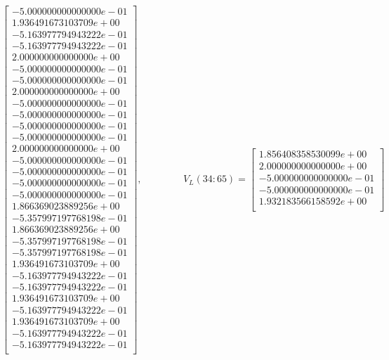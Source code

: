 \documentclass[12pt]{article}
\begin{document}
\begin{itemize}
\begin{small}
$$\begin{bmatrix}
    -5.000000000000000e-01\\
     1.936491673103709e+00\\
    -5.163977794943222e-01\\
    -5.163977794943222e-01\\
     2.000000000000000e+00\\
    -5.000000000000000e-01\\
    -5.000000000000000e-01\\
     2.000000000000000e+00\\
    -5.000000000000000e-01\\
    -5.000000000000000e-01\\
    -5.000000000000000e-01\\
    -5.000000000000000e-01\\
     2.000000000000000e+00\\
    -5.000000000000000e-01\\
    -5.000000000000000e-01\\
    -5.000000000000000e-01\\
    -5.000000000000000e-01\\
     1.866369023889256e+00\\
    -5.357997197768198e-01\\
     1.866369023889256e+00\\
    -5.357997197768198e-01\\
    -5.357997197768198e-01\\
     1.936491673103709e+00\\
    -5.163977794943222e-01\\
    -5.163977794943222e-01\\
     1.936491673103709e+00\\
    -5.163977794943222e-01\\
     1.936491673103709e+00\\
    -5.163977794943222e-01\\
    -5.163977794943222e-01\\
    \end{bmatrix},\hspace{50pt}
    V_L(34:65) = \begin{bmatrix}
     1.856408358530099e+00\\
     2.000000000000000e+00\\
    -5.000000000000000e-01\\
    -5.000000000000000e-01\\
     1.932183566158592e+00\\

\end{bmatrix}$$
\end{small}
\end{itemize}
\end{document}
